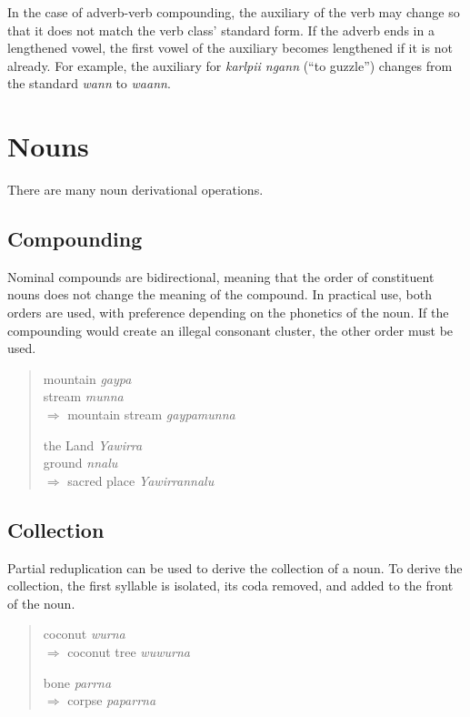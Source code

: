 In the case of adverb-verb compounding, the auxiliary of the verb may change so
that it does not match the verb class' standard form. If the adverb ends in a
lengthened vowel, the first vowel of the auxiliary becomes lengthened if it is
not already. For example, the auxiliary for \textit{karlpii ngann} (``to
guzzle'') changes from the standard \textit{wann} to \textit{waann}.

\section{Nouns}

There are many noun derivational operations.

\subsection{Compounding}

Nominal compounds are bidirectional, meaning that the order of constituent nouns
does not change the meaning of the compound. In practical use, both orders are
used, with preference depending on the phonetics of the noun. If the compounding
would create an illegal consonant cluster, the other order must be used.

\begin{quote}
\begin{multicols}{2}
mountain \textit{gaypa}\\
stream \textit{munna}\\
$\Rightarrow$ mountain stream \textit{gaypamunna}

the Land \textit{Yawirra}\\
ground \textit{nnalu}\\
$\Rightarrow$ sacred place \textit{Yawirrannalu}
\end{multicols}
\end{quote}

\subsection{Collection}

Partial reduplication can be used to derive the collection of a noun. To derive
the collection, the first syllable is isolated, its coda removed, and added to
the front of the noun.

\begin{quote}
\begin{multicols}{2}
coconut \textit{wurna}\\
$\Rightarrow$ coconut tree \textit{wuwurna}

bone \textit{parrna}\\
$\Rightarrow$ corpse \textit{paparrna}
\end{multicols}
\end{quote}

